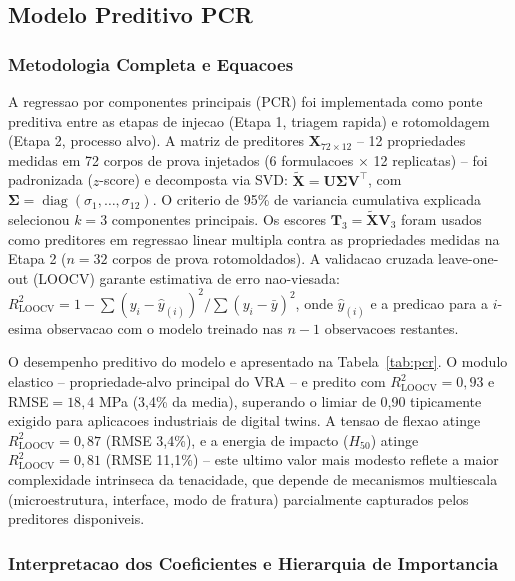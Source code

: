 \documentclass[11pt,a4paper,oneside]{article}
\begin{document}
\subsection{Modelo Preditivo PCR}\label{sec:pcr}

\subsubsection{Metodologia Completa e Equacoes}

A regressao por componentes principais (PCR) foi implementada como ponte preditiva entre as etapas de injecao (Etapa 1, triagem rapida) e rotomoldagem (Etapa 2, processo alvo). A matriz de preditores $\mathbf{X}_{72\times 12}$ -- 12 propriedades medidas em 72 corpos de prova injetados (6 formulacoes $\times$ 12 replicatas) -- foi padronizada ($z$-score) e decomposta via SVD: $\tilde{\mathbf{X}}{=}\mathbf{U}\boldsymbol{\Sigma}\mathbf{V}^\top$, com $\boldsymbol{\Sigma}{=}\operatorname{diag}(\sigma_1,\dots,\sigma_{12})$. O criterio de 95\% de variancia cumulativa explicada selecionou $k{=}3$ componentes principais. Os escores $\mathbf{T}_3{=}\tilde{\mathbf{X}}\mathbf{V}_3$ foram usados como preditores em regressao linear multipla contra as propriedades medidas na Etapa 2 ($n{=}32$ corpos de prova rotomoldados). A validacao cruzada leave-one-out (LOOCV) garante estimativa de erro nao-viesada: $R^2_{\text{LOOCV}}{=}1{-}\sum(y_i{-}\hat{y}_{(i)})^2/\sum(y_i{-}\bar{y})^2$, onde $\hat{y}_{(i)}$ e a predicao para a $i$-esima observacao com o modelo treinado nas $n{-}1$ observacoes restantes.

O desempenho preditivo do modelo e apresentado na Tabela~\ref{tab:pcr}. O modulo elastico -- propriedade-alvo principal do VRA -- e predito com $R^2_{\text{LOOCV}}{=}0{,}93$ e RMSE${=}18{,}4$ MPa (3,4\% da media), superando o limiar de 0,90 tipicamente exigido para aplicacoes industriais de digital twins. A tensao de flexao atinge $R^2_{\text{LOOCV}}{=}0{,}87$ (RMSE 3,4\%), e a energia de impacto ($H_{50}$) atinge $R^2_{\text{LOOCV}}{=}0{,}81$ (RMSE 11,1\%) -- este ultimo valor mais modesto reflete a maior complexidade intrinseca da tenacidade, que depende de mecanismos multiescala (microestrutura, interface, modo de fratura) parcialmente capturados pelos preditores disponiveis.

\subsubsection{Interpretacao dos Coeficientes e Hierarquia de Importancia}
\end{document}

